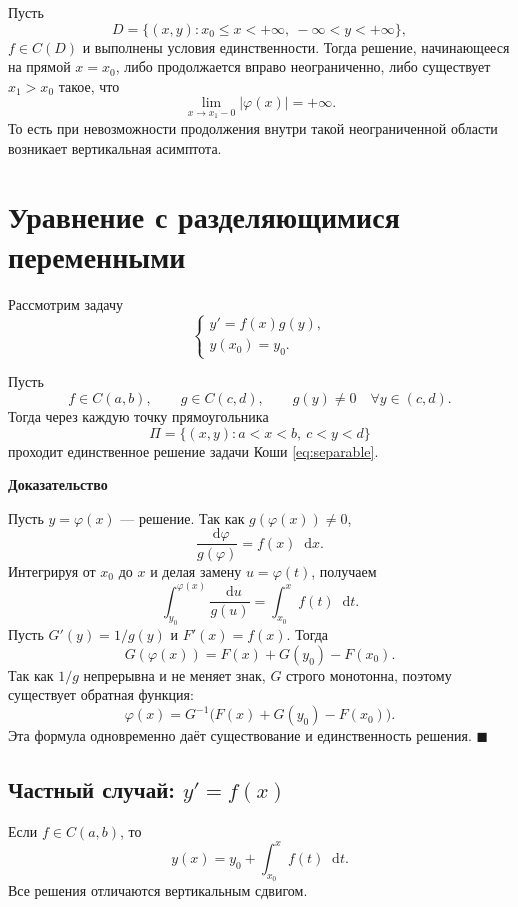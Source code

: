 \documentclass[12pt,a4paper]{article}
\numberwithin{equation}{section}
\newcommand{\dd}{\mathop{}\!\mathrm{d}}
\renewenvironment{proof}[1][Доказательство]{\begin{center}\textbf{#1}\end{center}}{\hfill$\blacksquare$\par}
\begin{document}
\begin{theoremHSE}
Пусть
\[
D=\{(x,y):x_0\le x<+\infty,\ -\infty<y<+\infty\},
\]
$f\in C(D)$ и выполнены условия единственности. Тогда решение, начинающееся на прямой $x=x_0$, либо продолжается вправо неограниченно, либо существует $x_1>x_0$ такое, что
\[
\lim_{x\to x_1-0}|\varphi(x)|=+\infty.
\]
То есть при невозможности продолжения внутри такой неограниченной области возникает вертикальная асимптота.
\end{theoremHSE}

\section[Разделяющиеся переменные]{Уравнение с разделяющимися переменными}

Рассмотрим задачу
\begin{equation}
\begin{cases}
 y'=f(x)g(y),\\
 y(x_0)=y_0.
\end{cases}
\label{eq:separable}
\end{equation}

\begin{theoremHSE}
Пусть
\[
f\in C(a,b),\qquad g\in C(c,d),\qquad g(y)\neq0\quad \forall y\in(c,d).
\]
Тогда через каждую точку прямоугольника
\[
\Pi=\{(x,y):a<x<b,\ c<y<d\}
\]
проходит единственное решение задачи Коши \eqref{eq:separable}.
\end{theoremHSE}

\begin{proof}
Пусть $y=\varphi(x)$ --- решение. Так как $g(\varphi(x))\neq0$,
\[
\frac{\dd\varphi}{g(\varphi)}=f(x)\dd x.
\]
Интегрируя от $x_0$ до $x$ и делая замену $u=\varphi(t)$, получаем
\[
\int_{y_0}^{\varphi(x)}\frac{\dd u}{g(u)}
=
\int_{x_0}^{x}f(t)\dd t.
\]
Пусть $G'(y)=1/g(y)$ и $F'(x)=f(x)$. Тогда
\[
G(\varphi(x))=F(x)+G(y_0)-F(x_0).
\]
Так как $1/g$ непрерывна и не меняет знак, $G$ строго монотонна, поэтому существует обратная функция:
\[
\varphi(x)=G^{-1}\bigl(F(x)+G(y_0)-F(x_0)\bigr).
\]
Эта формула одновременно даёт существование и единственность решения.
\end{proof}

\subsection{Частный случай: \texorpdfstring{$y'=f(x)$}{y'=f(x)}}
Если $f\in C(a,b)$, то
\[
y(x)=y_0+\int_{x_0}^{x}f(t)\dd t.
\]
Все решения отличаются вертикальным сдвигом.
\end{document}
